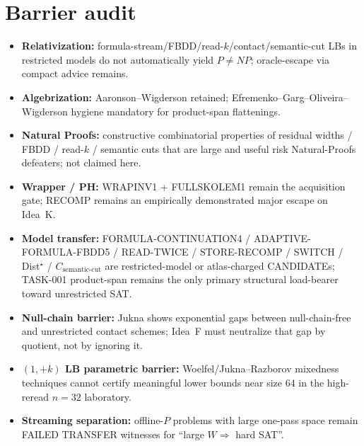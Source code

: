\documentclass[11pt]{article}
\begin{document}
\section*{Barrier audit}
\begin{itemize}
\item \textbf{Relativization:} formula-stream/FBDD/read-$k$/contact/semantic-cut LBs in
  restricted models do not automatically yield $P\neq NP$; oracle-escape via compact advice remains.
\item \textbf{Algebrization:} Aaronson--Wigderson retained; Efremenko--Garg--Oliveira--Wigderson
  hygiene mandatory for product-span flattenings.
\item \textbf{Natural Proofs:} constructive combinatorial properties of residual widths / FBDD /
  read-$k$ / semantic cuts that are large and useful risk Natural-Proofs defeaters; not claimed here.
\item \textbf{Wrapper / PH:} WRAPINV1 + FULLSKOLEM1 remain the acquisition gate;
  RECOMP remains an empirically demonstrated major escape on Idea~K.
\item \textbf{Model transfer:} FORMULA-CONTINUATION4 / ADAPTIVE-FORMULA-FBDD5 / READ-TWICE /
  STORE-RECOMP / SWITCH / Dist$^\star$ / $C_{\mathrm{semantic\textrm{-}cut}}$ are
  restricted-model or atlas-charged CANDIDATEs; TASK-001 product-span remains the only
  primary structural load-bearer toward unrestricted SAT.
\item \textbf{Null-chain barrier:} Jukna shows exponential gaps between null-chain-free and
  unrestricted contact schemes; Idea~F must neutralize that gap by quotient, not by ignoring it.
\item \textbf{$(1,+k)$ LB parametric barrier:} Woelfel/Jukna--Razborov mixedness techniques
  cannot certify meaningful lower bounds near size $64$ in the high-reread $n=32$ laboratory.
\item \textbf{Streaming separation:} offline-$P$ problems with large one-pass space remain
  FAILED TRANSFER witnesses for ``large $W\Rightarrow$ hard SAT''.
\end{itemize}
\end{document}
